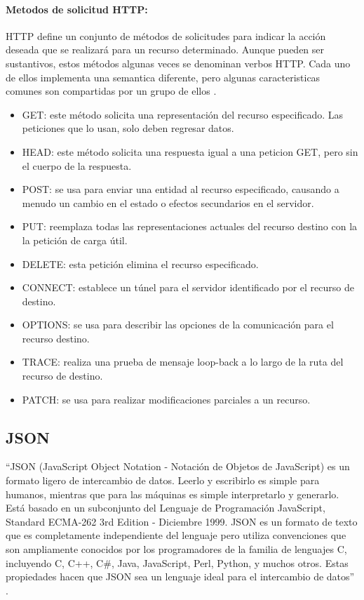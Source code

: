 \paragraph{Metodos de solicitud HTTP:}

HTTP define un conjunto de métodos de solicitudes para indicar la acción deseada que se realizará para un recurso determinado. Aunque pueden ser sustantivos, estos métodos algunas veces se denominan verbos HTTP. Cada uno de ellos implementa una semantica diferente, pero algunas caracteristicas comunes son compartidas por un grupo de ellos \cite{HTTPM}.\\

\begin{itemize}
	\item GET: este método solicita una representación del recurso especificado. Las peticiones que lo usan, solo deben regresar datos.
	\item HEAD: este método solicita una respuesta igual a una peticion GET, pero sin el cuerpo de la respuesta.
	\item POST: se usa para enviar una entidad al recurso especificado, causando a menudo un cambio en el estado o efectos secundarios en el servidor.
	\item PUT: reemplaza todas las representaciones actuales del recurso destino con la la petición de carga útil.
	\item DELETE: esta petición elimina el recurso especificado.
	\item CONNECT: establece un túnel para el servidor identificado por el recurso de destino.
	\item OPTIONS: se usa para describir las opciones de la comunicación para el recurso destino.
	\item TRACE: realiza una prueba de mensaje loop-back a lo largo de la ruta del recurso de destino. 
	\item PATCH: se usa para realizar modificaciones parciales a un recurso.
\end{itemize}

\subsection{JSON}

``JSON (JavaScript Object Notation - Notación de Objetos de JavaScript) es un formato ligero de intercambio de datos. Leerlo y escribirlo es simple para humanos, mientras que para las máquinas es simple interpretarlo y generarlo. Está basado en un subconjunto del Lenguaje de Programación JavaScript, Standard ECMA-262 3rd Edition - Diciembre 1999. JSON es un formato de texto que es completamente independiente del lenguaje pero utiliza convenciones que son ampliamente conocidos por los programadores de la familia de lenguajes C, incluyendo C, C++, C\#, Java, JavaScript, Perl, Python, y muchos otros. Estas propiedades hacen que JSON sea un lenguaje ideal para el intercambio de datos'' \cite{JSON}.\\

